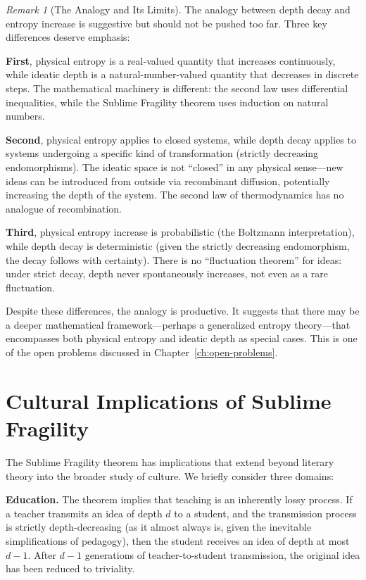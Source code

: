 \documentclass[11pt,openany]{book}
\theoremstyle{definition}
\theoremstyle{plain}
\theoremstyle{remark}
\newtheorem{remark}[axiom]{Remark}
\begin{document}
\begin{remark}[The Analogy and Its Limits]
The analogy between depth decay and entropy increase is suggestive but should not be pushed too far. Three key differences deserve emphasis:

\textbf{First}, physical entropy is a real-valued quantity that increases continuously, while ideatic depth is a natural-number-valued quantity that decreases in discrete steps. The mathematical machinery is different: the second law uses differential inequalities, while the Sublime Fragility theorem uses induction on natural numbers.

\textbf{Second}, physical entropy applies to closed systems, while depth decay applies to systems undergoing a specific kind of transformation (strictly decreasing endomorphisms). The ideatic space is not ``closed'' in any physical sense---new ideas can be introduced from outside via recombinant diffusion, potentially increasing the depth of the system. The second law of thermodynamics has no analogue of recombination.

\textbf{Third}, physical entropy increase is probabilistic (the Boltzmann interpretation), while depth decay is deterministic (given the strictly decreasing endomorphism, the decay follows with certainty). There is no ``fluctuation theorem'' for ideas: under strict decay, depth never spontaneously increases, not even as a rare fluctuation.

Despite these differences, the analogy is productive. It suggests that there may be a deeper mathematical framework---perhaps a generalized entropy theory---that encompasses both physical entropy and ideatic depth as special cases. This is one of the open problems discussed in Chapter~\ref{ch:open-problems}.
\end{remark}

\section{Cultural Implications of Sublime Fragility}

The Sublime Fragility theorem has implications that extend beyond literary theory into the broader study of culture. We briefly consider three domains:

\textbf{Education.} The theorem implies that teaching is an inherently lossy process. If a teacher transmits an idea of depth $d$ to a student, and the transmission process is strictly depth-decreasing (as it almost always is, given the inevitable simplifications of pedagogy), then the student receives an idea of depth at most $d - 1$. After $d - 1$ generations of teacher-to-student transmission, the original idea has been reduced to triviality.
\end{document}
